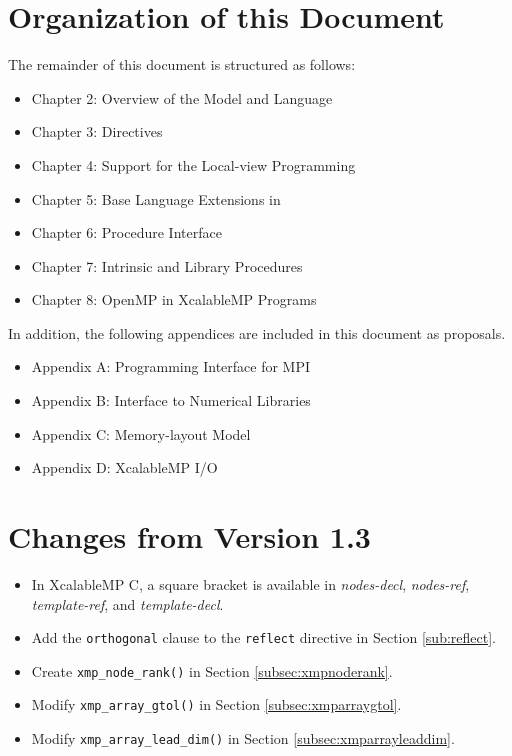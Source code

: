 \section{Organization of this Document}

The remainder of this document is structured as follows:

\begin{itemize}
 \item Chapter 2: Overview of the {\XMP} Model and Language
 \item Chapter 3: Directives 
 \item Chapter 4: Support for the Local-view Programming
 \item Chapter 5: Base Language Extensions in {\XMPC}
 \item Chapter 6: Procedure Interface
 \item Chapter 7: Intrinsic and Library Procedures
 \item Chapter 8: OpenMP in XcalableMP Programs
\end{itemize}
%
In addition, the following appendices are included in this document as
proposals.
%
\begin{itemize}
 \item Appendix A: Programming Interface for MPI
 \item Appendix B: Interface to Numerical Libraries
 \item Appendix C: Memory-layout Model
 \item Appendix D: XcalableMP I/O
\end{itemize}

\section{Changes from Version 1.3}
\begin{itemize}
  \item In XcalableMP C, a square bracket is available in {\it nodes-decl}, {\it nodes-ref}, 
  {\it template-ref}, and {\it template-decl}.
  \item Add the {\tt orthogonal} clause to the {\tt reflect} directive in Section \ref{sub:reflect}.
  \item Create {\tt xmp\_node\_rank()} in Section \ref{subsec:xmpnoderank}.
  \item Modify {\tt xmp\_array\_gtol()} in Section \ref{subsec:xmparraygtol}.
  \item Modify {\tt xmp\_array\_lead\_dim()} in Section \ref{subsec:xmparrayleaddim}.
\end{itemize}

